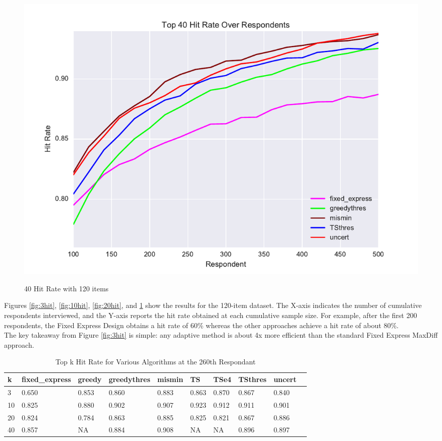 \documentclass[nonblindrev]{informs3}
\begin{document}
\begin{figure}
\caption{40 Hit Rate with 120 items}
\includegraphics[width=1\textwidth]{plots/hr120v20k40.pdf}
\label{fig:40hit}
\end{figure}
Figures \ref{fig:3hit}, \ref{fig:10hit}, \ref{fig:20hit}, and \ref{fig:40hit} show the results for the 120-item dataset.  The X-axis indicates the number of cumulative respondents interviewed, and the Y-axis reports the hit rate obtained at each cumulative sample size.  For example, after the first 200 respondents, the Fixed Express Design obtains a hit rate of 60\% whereas the other approaches achieve a hit rate of about 80\%.\\
The key takeaway from Figure \ref{fig:3hit} is simple: any adaptive method is about 4x more efficient than the standard Fixed Express MaxDiff approach.
\begin{table}
\begin{center}
\begin{tabular}{llllllllll}
\hline   k &  fixed\_express &  greedy &  greedythres &  mismin &    TS &  TSe4 &  TSthres &  uncert \\ \hline    3 &          0.650 &   0.853 &        0.860 &   0.883 & 0.863 & 0.870 &    0.867 &   0.840 \\  10 &          0.825 &   0.880 &        0.902 &   0.907 & 0.923 & 0.912 &    0.911 &   0.901 \\  20 &          0.824 &   0.784 &        0.863 &   0.885 & 0.825 & 0.821 &    0.867 &   0.886 \\  40 &          0.857 &   NA &        0.884 &   0.908 & NA & NA &    0.896 &   0.897 \end{tabular}
\end{center}
\caption{Top k Hit Rate for Various Algorithms at the 260th Respondant}
\label{table:at260}
\end{table}
\end{document}

